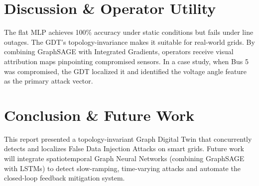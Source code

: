 \documentclass[journal]{IEEEtran}
\begin{document}
\section{Discussion \& Operator Utility}
The flat MLP achieves 100\% accuracy under static conditions but fails under line outages. The GDT's topology-invariance makes it suitable for real-world grids. By combining GraphSAGE with Integrated Gradients, operators receive visual attribution maps pinpointing compromised sensors. In a case study, when Bus 5 was compromised, the GDT localized it and identified the voltage angle feature as the primary attack vector.

\section{Conclusion \& Future Work}
This report presented a topology-invariant Graph Digital Twin that concurrently detects and localizes False Data Injection Attacks on smart grids. Future work will integrate spatiotemporal Graph Neural Networks (combining GraphSAGE with LSTMs) to detect slow-ramping, time-varying attacks and automate the closed-loop feedback mitigation system.
\end{document}
